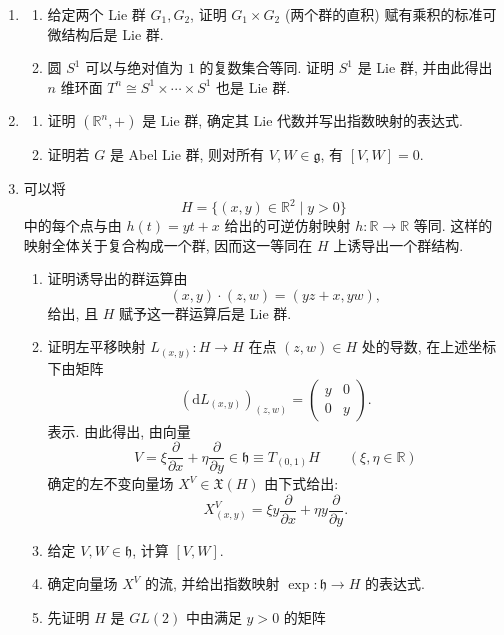 \begin{RiemannExercise}\label{ex:lie-groups}
\begin{enumerate}[label=(\arabic*),ref=\arabic*,leftmargin=*]
\item\label{ex:products-of-lie-groups-and-tori}
\begin{enumerate}[label=(\alph*),leftmargin=*]
\item 给定两个 Lie 群 $G_1,G_2$, 证明 $G_1\times G_2$ (两个群的直积) 赋有乘积的标准可微结构后是 Lie 群.
\item 圆 $S^1$ 可以与绝对值为 $1$ 的复数集合等同. 证明 $S^1$ 是 Lie 群, 并由此得出 $n$ 维环面 $T^n\cong S^1\times\cdots\times S^1$ 也是 Lie 群.
\end{enumerate}
\item\label{ex:abelian-lie-groups-and-exponential}
\begin{enumerate}[label=(\alph*),leftmargin=*]
\item 证明 $(\mathbb{R}^n,+)$ 是 Lie 群, 确定其 Lie 代数并写出指数映射的表达式.
\item 证明若 $G$ 是 Abel Lie 群, 则对所有 $V,W\in\mathfrak g$, 有 $[V,W]=0$.
\end{enumerate}
\item\label{ex:affine-maps-lie-group} 可以将
\[
  H=\{(x,y)\in\mathbb{R}^2\mid y>0\}
\]
中的每个点与由 $h(t)=yt+x$ 给出的可逆仿射映射 $h:\mathbb{R}\to\mathbb{R}$ 等同. 这样的映射全体关于复合构成一个群, 因而这一等同在 $H$ 上诱导出一个群结构.
\begin{enumerate}[label=(\alph*),leftmargin=*]
\item 证明诱导出的群运算由
\[
  (x,y)\cdot(z,w)=(yz+x,yw),
\]
给出, 且 $H$ 赋予这一群运算后是 Lie 群.
\item 证明左平移映射 $L_{(x,y)}:H\to H$ 在点 $(z,w)\in H$ 处的导数, 在上述坐标下由矩阵
\[
  (\mathrm{d}L_{(x,y)})_{(z,w)}=\begin{pmatrix}y&0\\0&y\end{pmatrix}.
\]
表示. 由此得出, 由向量
\[
  V=\xi\frac{\partial}{\partial x}+\eta\frac{\partial}{\partial y}
   \in\mathfrak h\equiv T_{(0,1)}H\qquad(\xi,\eta\in\mathbb{R})
\]
确定的左不变向量场 $X^V\in\mathfrak{X}(H)$ 由下式给出:
\[
  X_{(x,y)}^V=\xi y\frac{\partial}{\partial x}+\eta y\frac{\partial}{\partial y}.
\]
\item 给定 $V,W\in\mathfrak h$, 计算 $[V,W]$.
\item 确定向量场 $X^V$ 的流, 并给出指数映射 $\exp:\mathfrak h\to H$ 的表达式.
\item 先证明 $H$ 是 $GL(2)$ 中由满足 $y>0$ 的矩阵

\end{enumerate}
\end{enumerate}
\end{RiemannExercise}
